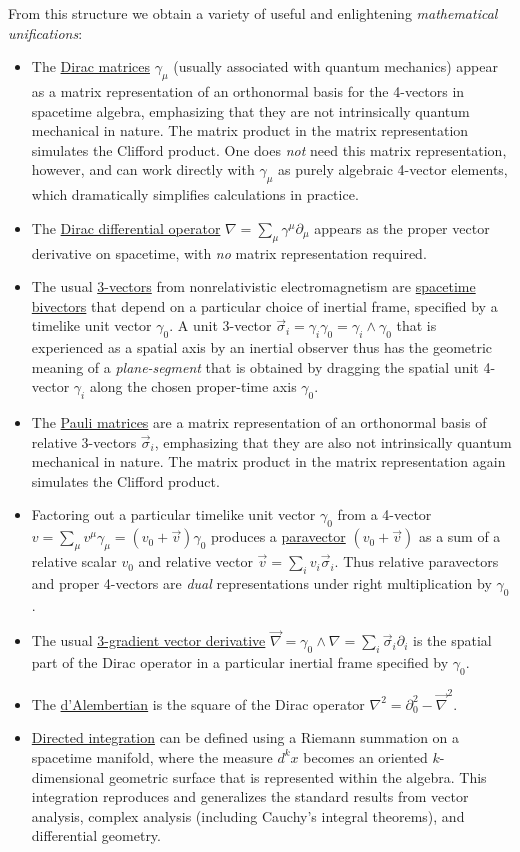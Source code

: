 \documentclass[1p,sort&compress]{elsarticle}
\numberwithin{equation}{section}
\newcommand{\rv}[1]{\vec{#1}}
\begin{document}
From this structure we obtain a variety of useful and enlightening \emph{mathematical unifications}:
\begin{itemize}
  \item The \uline{Dirac matrices} $\gamma_\mu$ (usually associated with quantum mechanics) appear as a matrix representation of an orthonormal basis for the 4-vectors in spacetime algebra, emphasizing that they are not intrinsically quantum mechanical in nature.  The matrix product in the matrix representation simulates the Clifford product.  One does \emph{not} need this matrix representation, however, and can work directly with $\gamma_\mu$ as purely algebraic 4-vector elements, which dramatically simplifies calculations in practice.
  \item The \uline{Dirac differential operator} $\nabla = \sum_\mu \gamma^\mu \partial_\mu$ appears as the proper vector derivative on spacetime, with \emph{no} matrix representation required.
  \item The usual \uline{3-vectors} from nonrelativistic electromagnetism are \uline{spacetime bivectors} that depend on a particular choice of inertial frame, specified by a timelike unit vector $\gamma_0$.  A unit 3-vector $\rv{\sigma}_i = \gamma_i\gamma_0 = \gamma_i\wedge\gamma_0$ that is experienced as a spatial axis by an inertial observer thus has the geometric meaning of a \emph{plane-segment} that is obtained by dragging the spatial unit 4-vector $\gamma_i$ along the chosen proper-time axis $\gamma_0$.
  \item The \uline{Pauli matrices} are a matrix representation of an orthonormal basis of relative 3-vectors $\rv{\sigma}_i$, emphasizing that they are also not intrinsically quantum mechanical in nature.  The matrix product in the matrix representation again simulates the Clifford product.
  \item Factoring out a particular timelike unit vector $\gamma_0$ from a 4-vector $v = \sum_\mu v^\mu\gamma_\mu = (v_0 + \rv{v})\gamma_0$ produces a \uline{paravector} $(v_0 + \rv{v})$ as a sum of a relative scalar $v_0$ and relative vector $\rv{v} = \sum_i v_i \rv{\sigma}_i$.  Thus relative paravectors and proper 4-vectors are \emph{dual} representations under right multiplication by $\gamma_0$.
  \item The usual \uline{3-gradient vector derivative} $\rv{\nabla} = \gamma_0\wedge\nabla = \sum_i \rv{\sigma}_i\partial_i $ is the spatial part of the Dirac operator in a particular inertial frame specified by $\gamma_0$.
  \item The \uline{d'Alembertian} is the square of the Dirac operator $\nabla^2 = \partial_0^2 - \rv{\nabla}^2$.
  \item \uline{Directed integration} can be defined using a Riemann summation on a spacetime manifold, where the measure $d^k\!x$ becomes an oriented $k$-dimensional geometric surface that is represented within the algebra. This integration reproduces and generalizes the standard results from vector analysis, complex analysis (including Cauchy's integral theorems), and differential geometry.
\end{itemize}
\end{document}
